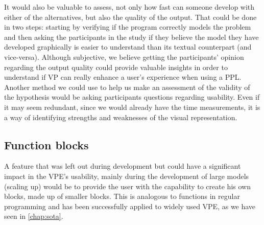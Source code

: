 It would also be valuable to assess, not only how fast can someone develop with either
of the alternatives, but also the quality of the output. That could be done in two
steps: starting by verifying if the program correctly models the problem and then
asking the participants in the study if they believe the model they
have developed graphically is easier to understand than its textual counterpart (and
vice-versa).
Although subjective, we believe getting the participants' opinion
regarding the output quality could provide valuable insights in order to understand if VP can
really enhance a user's experience when using a PPL. Another method we could use
to help us make an assessment of the validity of the hypothesis would be asking
participants questions regarding usability. Even if it may seem redundant, since
we would already have the time measurements, it is a way of identifying strengths and
weaknesses of the visual representation.

\subsection{Function blocks}

A feature that was left out during development but could have a significant
impact in the VPE's usability, mainly during the development of large models
(scaling up) would be to provide the user with the capability to create his own
blocks, made up of smaller blocks. This is analogous to functions in regular
programming and has been successfully applied to widely used VPE, as we have
seen in \ref{chap:sota}.
